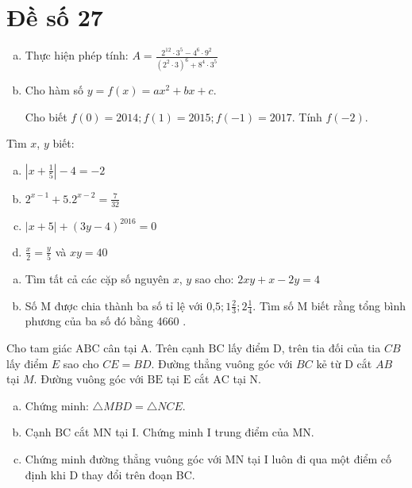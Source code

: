 \onehalfspacing
\section{Đề số 27}

\begin{bt} 
   \hfill
   \begin{enumerate}[a.]
    \item Thực hiện phép tính: $A=\frac{2^{12} \cdot 3^5-4^6 \cdot 9^2}{\left(2^2 \cdot 3\right)^6+8^4 \cdot 3^5}$
    \item Cho hàm số $y=f(x)=a x^2+b x+c$.
    
    Cho biết $f(0)=2014 ; f(1)=2015 ; f(-1)=2017$. Tính $f(-2)$.
   \end{enumerate}
\loigiai{}
\end{bt}

\begin{bt}
   Tìm $x$, $y$ biết:
	\begin{enumerate}[a.]
        \item $\left|x+\frac{1}{5}\right|-4=-2$
        \item $2^{x-1}+5.2^{x-2}=\frac{7}{32}$
        \item $|x+5|+(3 y-4)^{2016}=0$
        \item $\frac{x}{2}=\frac{y}{5}$ và $x y=40$
    \end{enumerate}
	\loigiai{} 
\end{bt}

\begin{bt}
    \hfill
    \begin{enumerate}[a.]
        \item Tìm tất cả các cặp số nguyên $x$, $y$ sao cho: $2 x y+x-2 y=4$
        \item Số $\mathrm{M}$ được chia thành ba số tỉ lệ với 0,$5 ; 1 \frac{2}{3} ; 2 \frac{1}{4}$. Tìm số $\mathrm{M}$ biết rằng tổng bình phương của ba số đó bằng 4660 .
    \end{enumerate}
	\loigiai{}
\end{bt}

\begin{bt}
    Cho tam giác $\mathrm{ABC}$ cân tại $\mathrm{A}$. Trên cạnh $\mathrm{BC}$ lấy điểm $\mathrm{D}$, trên tia đối của tia $C B$ lấy điểm $E$ sao cho $C E=B D$. Đường thẳng vuông góc với $B C$ kẻ từ $\mathrm{D}$ cắt $A B$ tại $M$. Đường vuông góc với $\mathrm{BE}$ tại $\mathrm{E}$ cắt $\mathrm{AC}$ tại $\mathrm{N}$.
    \begin{enumerate}[a.]
        \item Chứng minh: $\triangle M B D=\triangle N C E$.
        \item Cạnh $\mathrm{BC}$ cắt $\mathrm{MN}$ tại $\mathrm{I}$. Chứng minh $\mathrm{I}$ trung điểm của $\mathrm{MN}$.
        \item Chứng minh đường thẳng vuông góc với $\mathrm{MN}$ tại $\mathrm{I}$ luôn đi qua một điểm cố định khi D thay đổi trên đoạn BC.
    \end{enumerate}
	\loigiai{}
\end{bt}

